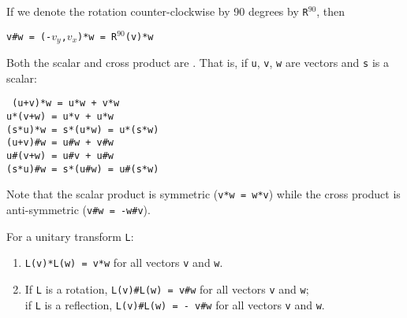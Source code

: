 \documentclass[12pt]{article}
\begin{document}
If we denote the rotation counter-clockwise by 90 degrees by {\tt R}$^{90}$,
then \\
\centerline{\tt v\#w = (-$v_y$,$v_x$)*w = R$^{90}$(v)*w}

Both the scalar and cross product are .  That is,
if {\tt u}, {\tt v}, {\tt w} are vectors and {\tt s} is a scalar:
\begin{center}
\tt
(u+v)*w = u*w + v*w \\
u*(v+w) = u*v + u*w \\
(s*u)*w = s*(u*w) = u*(s*w) \\
(u+v)\#w = u\#w + v\#w \\
u\#(v+w) = u\#v + u\#w \\
(s*u)\#w = s*(u\#w) = u\#(s*w)
\end{center}

Note that the scalar product is symmetric ({\tt v*w = w*v})
while the cross product is anti-symmetric ({\tt v\#w = -w\#v}).

\begin{lemma}
For a unitary transform {\tt L}:
\begin{enumerate}
\item {\tt L(v)*L(w) = v*w} for all vectors {\tt v} and {\tt w}.
\item If {\tt L} is a rotation,
         {\tt L(v)\#L(w) = v\#w} for all vectors {\tt v} and {\tt w}; \\
      if {\tt L} is a reflection,
         {\tt L(v)\#L(w) = - v\#w} for all vectors {\tt v} and {\tt w}.
\end{enumerate}
\end{lemma}
\end{document}
